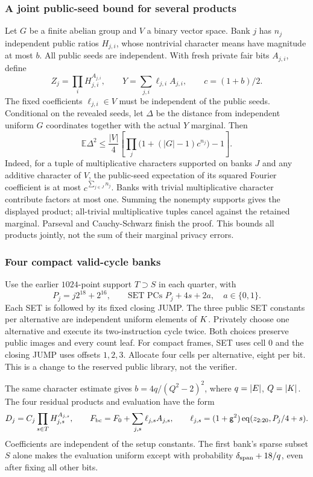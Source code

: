 \subsubsection{A joint public-seed bound for several products}

Let $G$ be a finite abelian group and $V$ a binary vector space. Bank $j$ has $n_j$ independent public ratios $H_{j,i}$, whose nontrivial character means have magnitude at most $b$. All public seeds are independent. With fresh private fair bits $A_{j,i}$, define
\[
 Z_j=\prod_iH_{j,i}^{A_{j,i}},\qquad
 Y=\sum_{j,i}\ell_{j,i}A_{j,i},\qquad c=(1+b)/2.
\]
The fixed coefficients $\ell_{j,i}\in V$ must be independent of the public seeds. Conditional on the revealed seeds, let $\Delta$ be the distance from independent uniform $G$ coordinates together with the actual $Y$ marginal. Then
\[
 \mathbb E\Delta^2\le
 \frac{|V|}{4}\left[\prod_j\bigl(1+(|G|-1)c^{n_j}\bigr)-1\right].
\]
Indeed, for a tuple of multiplicative characters supported on banks $J$ and any additive character of $V$, the public-seed expectation of its squared Fourier coefficient is at most $c^{\sum_{j\in J}n_j}$. Banks with trivial multiplicative character contribute factors at most one. Summing the nonempty supports gives the displayed product; all-trivial multiplicative tuples cancel against the retained marginal. Parseval and Cauchy-Schwarz finish the proof. This bounds all products jointly, not the sum of their marginal privacy errors.

\subsubsection{Four compact valid-cycle banks}

Use the earlier $1024$-point support $T\supset S$ in each quarter, with
\[
 P_j=j2^{18}+2^{16},\qquad
 \text{SET PCs }P_j+4s+2a,\quad a\in\{0,1\}.
\]
Each SET is followed by its fixed closing JUMP. The three public SET constants per alternative are independent uniform elements of $K$. Privately choose one alternative and execute its two-instruction cycle twice. Both choices preserve public images and every count leaf. For compact frames, SET uses cell $0$ and the closing JUMP uses offsets $1,2,3$. Allocate four cells per alternative, eight per bit. This is a change to the reserved public library, not the verifier.

The same character estimate gives $b=4q/(Q^2-2)^2$, where $q=|E|$, $Q=|K|$. The four residual products and evaluation have the form
\[
 D_j=C_j\prod_{s\in T}H_{j,s}^{A_{j,s}},\qquad
 F_{\rm bc}=F_0+\sum_{j,s}\ell_{j,s}A_{j,s},\qquad
 \ell_{j,s}=(1+\mathsf{g}^2)\operatorname{eq}(z_{2:20},P_j/4+s).
\]
Coefficients are independent of the setup constants. The first bank's sparse subset $S$ alone makes the evaluation uniform except with probability $\delta_{\rm span}+18/q$, even after fixing all other bits.

